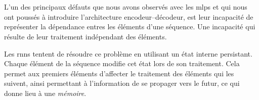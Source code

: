 \section{}
\label{sec.rnn}

L'un des principaux défauts que nous avons observés avec les \glspl{mlp} 
et qui nous ont poussés à introduire l'architecture encodeur--décodeur,
est leur incapacité de représenter la dépendance entres les éléments d'une séquence.
Une incapacité qui résulte de leur traitement indépendant des éléments.

Les \glspl{rnn} tentent de résoudre ce problème en utilisant un état interne persistant.
Chaque élément de la séquence modifie cet état lors de son traitement.
Cela permet aux premiers éléments d'affecter le traitement des éléments qui les suivent, 
ainsi permettant à l'information de se propager vers le futur,
ce qui donne lieu à une \emph{mémoire}.
